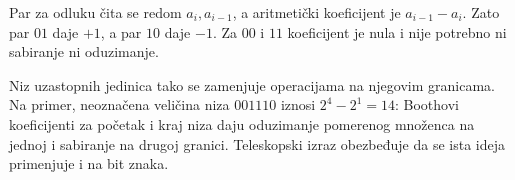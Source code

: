 Par za odluku čita se redom $a_i,a_{i-1}$, a aritmetički koeficijent je $a_{i-1}-a_i$. Zato par $01$ daje $+1$, a par $10$ daje $-1$. Za $00$ i $11$ koeficijent je nula i nije potrebno ni sabiranje ni oduzimanje.

Niz uzastopnih jedinica tako se zamenjuje operacijama na njegovim granicama. Na primer, neoznačena veličina niza $001110$ iznosi $2^4-2^1=14$: Boothovi koeficijenti za početak i kraj niza daju oduzimanje pomerenog množenca na jednoj i sabiranje na drugoj granici. Teleskopski izraz obezbeđuje da se ista ideja primenjuje i na bit znaka.
